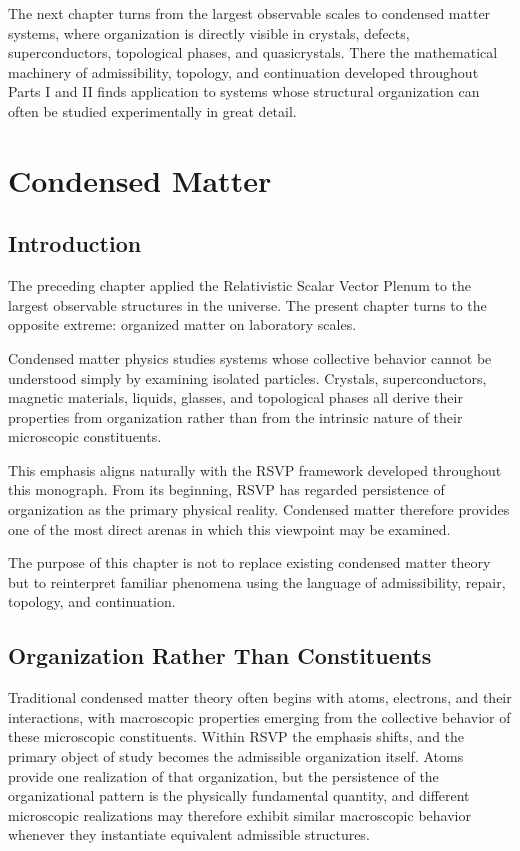\documentclass[11pt,oneside]{book}
\numberwithin{equation}{chapter}
\theoremstyle{definition}
\theoremstyle{plain}
\begin{document}
The next chapter turns from the largest observable scales to condensed
matter systems, where organization is directly visible in crystals,
defects, superconductors, topological phases, and quasicrystals. There the
mathematical machinery of admissibility, topology, and continuation
developed throughout Parts I and II finds application to systems whose
structural organization can often be studied experimentally in great
detail.

\chapter{Condensed Matter}

\section{Introduction}

The preceding chapter applied the Relativistic Scalar Vector Plenum to the
largest observable structures in the universe. The present chapter turns to
the opposite extreme: organized matter on laboratory scales.

Condensed matter physics studies systems whose collective behavior cannot be
understood simply by examining isolated particles. Crystals,
superconductors, magnetic materials, liquids, glasses, and topological
phases all derive their properties from organization rather than from the
intrinsic nature of their microscopic constituents.

This emphasis aligns naturally with the RSVP framework developed throughout
this monograph. From its beginning, RSVP has regarded persistence of
organization as the primary physical reality. Condensed matter therefore
provides one of the most direct arenas in which this viewpoint may be
examined.

The purpose of this chapter is not to replace existing condensed matter
theory but to reinterpret familiar phenomena using the language of
admissibility, repair, topology, and continuation.

\section{Organization Rather Than Constituents}

Traditional condensed matter theory often begins with atoms, electrons, and their interactions, with macroscopic properties emerging from the collective behavior of these microscopic constituents. Within RSVP the emphasis shifts, and the primary object of study becomes the admissible organization itself. Atoms provide one realization of that organization, but the persistence of the organizational pattern is the physically fundamental quantity, and different microscopic realizations may therefore exhibit similar macroscopic behavior whenever they instantiate equivalent admissible structures.
\end{document}
